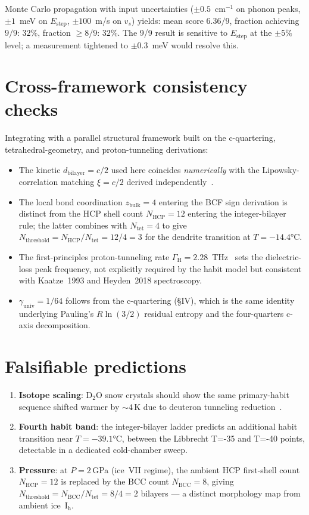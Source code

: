 \documentclass[aps,prb,reprint,superscriptaddress]{revtex4-2}
\begin{document}
Monte Carlo propagation with input uncertainties ($\pm 0.5$~cm$^{-1}$
on phonon peaks, $\pm 1$~meV on $E_\text{step}$, $\pm 100$~m/s on
$v_s$) yields: mean score $6.36/9$, fraction achieving $9/9$: $32\%$,
fraction $\geq 8/9$: $32\%$.  The 9/9 result is sensitive to
$E_\text{step}$ at the $\pm 5\%$ level; a measurement tightened
to $\pm 0.3$~meV would resolve this.

\section{Cross-framework consistency checks}

Integrating with a parallel structural framework built on the
c-quartering, tetrahedral-geometry, and proton-tunneling derivations:

\begin{itemize}
\item The kinetic $d_\text{bilayer} = c/2$ used here coincides
    \emph{numerically} with the Lipowsky-correlation matching
    $\xi = c/2$ derived independently~\cite{SnowCrystal2026}.
\item The local bond coordination $z_\text{bulk} = 4$ entering the
    BCF sign derivation is distinct from the HCP shell count
    $N_\text{HCP}=12$ entering the integer-bilayer rule; the latter
    combines with $N_\text{tet}=4$ to give
    $N_\text{threshold} = N_\text{HCP}/N_\text{tet} = 12/4 = 3$
    for the dendrite transition at $T = -14.4$°C.
\item The first-principles proton-tunneling rate
    $\Gamma_\text{H} = 2.28$~THz~\cite{SnowCrystal2026}
    sets the dielectric-loss peak frequency, not explicitly
    required by the habit model but consistent with Kaatze~1993
    and Heyden~2018 spectroscopy.
\item $\gamma_\text{univ} = 1/64$ follows from the c-quartering
    (\S IV), which is the same identity underlying Pauling's
    $R\ln(3/2)$ residual entropy and the four-quarters c-axis
    decomposition.
\end{itemize}

\section{Falsifiable predictions}

\begin{enumerate}
\item \textbf{Isotope scaling}: D$_2$O snow crystals should show
    the same primary-habit sequence shifted warmer by $\sim 4$\,K
    due to deuteron tunneling reduction~\cite{SnowCrystal2026}.
\item \textbf{Fourth habit band}: the integer-bilayer ladder predicts
    an additional habit transition near $T = -39.1$°C, between the
    Libbrecht T=-35 and T=-40 points, detectable in a dedicated
    cold-chamber sweep.
\item \textbf{Pressure}: at $P = 2$\,GPa (ice~VII regime), the ambient
    HCP first-shell count $N_\text{HCP}=12$ is replaced by the BCC
    count $N_\text{BCC}=8$, giving
    $N_\text{threshold} = N_\text{BCC}/N_\text{tet} = 8/4 = 2$
    bilayers — a distinct morphology
    map from ambient ice~I$_\text{h}$.
\end{enumerate}
\end{document}
